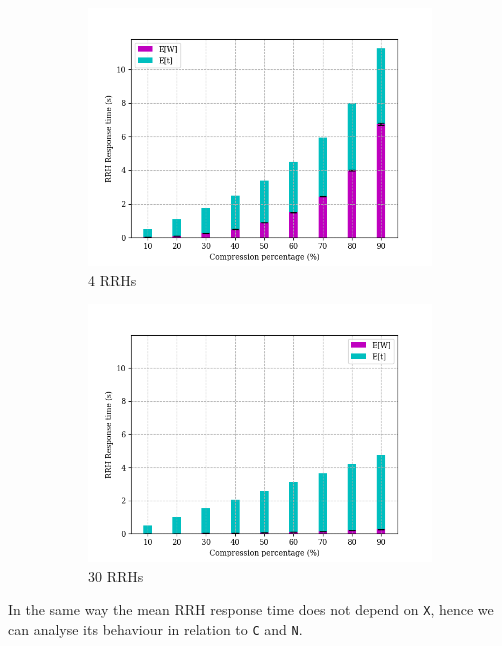 \documentclass[11pt,a4paper,oneside, openright]{article}
\begin{document}
\begin{figure}[H]
	\centering
	\begin{subfigure}{.5\textwidth}
		\centering
		\includegraphics[width=\linewidth]{images/response-time-rrh-ratio-4}
		\caption{4 RRHs}
		\label{fig:response-time-rrh-ratio-4}
	\end{subfigure}%
	\begin{subfigure}{.5\textwidth}
		\centering
		\includegraphics[width=\linewidth]{images/response-time-rrh-ratio-30}
		\caption{30 RRHs}
		\label{fig:response-time-rrh-ratio-30}
	\end{subfigure}
	\caption{}
	\label{fig:response-time-rrh-ratio}
\end{figure}
In the same way the mean RRH response time does not depend on \texttt{X}, hence we can analyse its behaviour in relation to \texttt{C} and \texttt{N}.
\end{document}
